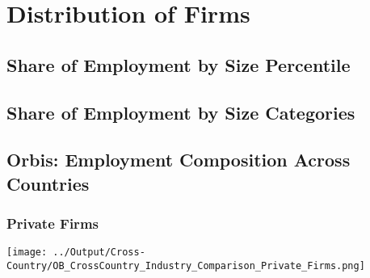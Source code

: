\documentclass[12pt,notitlepage]{article}
\begin{document}
\clearpage




\FloatBarrier
\section{Distribution of Firms} %
\label{sec:distribution-of-firms}
\FloatBarrier

\subsection{Share of Employment by Size Percentile} %
\label{sec:employment_by_size}

\begin{table}[!htpb]
\end{table}

\clearpage

\subsection{Share of Employment by Size Categories} %
\clearpage

\subsection{Orbis: Employment Composition Across Countries}

\subsubsection{Private Firms}
\begin{center}
 \texttt{[image: ../Output/Cross-Country/OB\_CrossCountry\_Industry\_Comparison\_Private\_Firms.png]}
\end{center}
\clearpage
\end{document}

